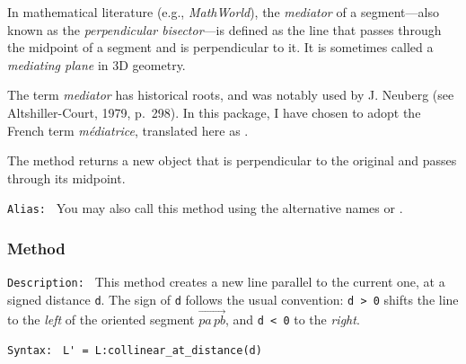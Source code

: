 In mathematical literature (e.g., \textit{MathWorld}), the \emph{mediator} of a segment—also known as the \emph{perpendicular bisector}—is defined as the line that passes through the midpoint of a segment and is perpendicular to it. It is sometimes called a \emph{mediating plane} in 3D geometry.

The term \emph{mediator} has historical roots, and was notably used by J. Neuberg (see Altshiller-Court, 1979, p.~298). In this package, I have chosen to adopt the French term \emph{médiatrice}, translated here as .

\medskip

The method returns a new  object that is perpendicular to the original and passes through its midpoint.

\medskip

\texttt{Alias: } You may also call this method using the alternative names  or .

\vspace{1em}
\begin{tkzexample}[latex=.5\textwidth]
\begin{center}
\end{center}
\end{tkzexample}


\subsubsection{Method }
\label{ssub:method_line_collinear_at_distance}

\texttt{Description: } This method creates a new line parallel to the current one, at a signed distance \texttt{d}.
The sign of \texttt{d} follows the usual convention:
\texttt{d > 0} shifts the line to the \emph{left} of the oriented segment \(\overrightarrow{pa\,pb}\),
and \texttt{d < 0} to the \emph{right}.

\medskip
\texttt{Syntax: } \verb|L' = L:collinear_at_distance(d)|

